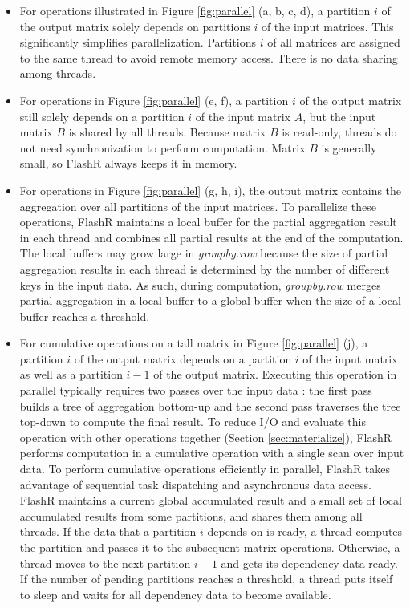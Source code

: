 \begin{itemize}
	\item For operations illustrated in Figure \ref{fig:parallel}
		(a, b, c, d), a partition $i$ of the output matrix solely depends
		on partitions $i$ of the input matrices. This significantly simplifies
		parallelization. Partitions $i$ of all matrices are assigned to
		the same thread to avoid remote memory access. There is no data sharing
		among threads.
	\item For operations in Figure \ref{fig:parallel} (e, f), a partition
		$i$ of the output matrix still solely depends on a partition
		$i$ of the input matrix $A$, but the input matrix
		$B$ is shared by all threads. Because matrix $B$ is
		read-only, threads do not need synchronization to perform computation.
		Matrix $B$ is generally small, so FlashR always keeps it in memory.
	\item For operations in Figure
		\ref{fig:parallel} (g, h, i), the output matrix contains the aggregation
		over all partitions of the input matrices. To parallelize these operations,
		FlashR maintains a local buffer for the partial aggregation result in each
		thread and combines all partial results at the end of
		the computation. The local buffers may grow large in
		\textit{groupby.row} because the size of partial aggregation
		results in each thread is determined by the number of different keys in
		the input data. As such, during computation, \textit{groupby.row} merges
		partial aggregation in a local buffer to a global buffer when the size of
		a local buffer reaches a threshold. 
	\item For cumulative operations on a tall matrix in Figure \ref{fig:parallel}
		(j), a partition $i$ of the output matrix depends on a partition $i$ of
		the input matrix as well as a partition $i-1$ of the output matrix.
		Executing this operation in parallel typically requires two passes over
		the input data \cite{Ladner1980}: the first pass builds a tree of
		aggregation bottom-up and the second pass traverses the tree top-down
		to compute the final result. To reduce I/O and evaluate this operation with
		other operations together (Section \ref{sec:materialize}), FlashR performs
		computation in a cumulative operation with a single scan over input
		data. To perform cumulative operations efficiently in parallel, FlashR
		takes advantage of sequential task dispatching and asynchronous data access.
		FlashR maintains
		a current global accumulated result and a small set of local accumulated
		results from some partitions, and shares them among all threads. If the data
		that a partition $i$ depends on is ready, a thread computes the partition
		and passes it to the subsequent matrix operations. Otherwise, a thread moves
		to the next partition $i+1$ and gets its dependency data ready. If the number
		of pending partitions reaches a threshold, a thread puts itself to sleep
		and waits for all dependency data to become available.
\end{itemize}


